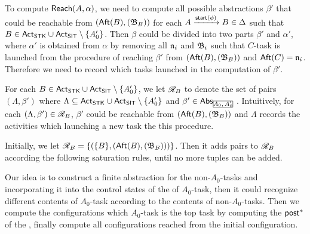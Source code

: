 To compute ${\sf Reach}(A,\alpha)$, we need to compute all possible abstractions $\beta'$ that could be reachable from $({\sf Aft}(B),({\mathfrak{B} }_{B}))$ for each $A\xrightarrow{{\mathsf{start} }(\phi)}B\in\Delta$ such that $B\in{\sf Act}_{\mathsf{STK}}\cup{\sf Act}_{\mathsf{SIT}}\setminus\{A_0'\}$. Then $\beta$ could be divided into two parts $\beta'$ and $\alpha'$, where $\alpha'$ is obtained from $\alpha$ by removing all $\mathfrak{n}_i$ and ${\mathfrak{B} }_i$ such that $C$-task is launched from the procedure of reaching $\beta'$ from $({\sf Aft}(B),({\mathfrak{B} }_{B}))$ and ${\sf Aft}(C) = \mathfrak{n}_i$. Therefore we need to record which tasks launched in the computation of $\beta'$.

For each $B\in{\sf Act}_{\mathsf{STK}}\cup{\sf Act}_{\mathsf{SIT}}\setminus\{A_0'\}$, we let $\mathscr{R}_{B}$ to denote the set of pairs $(\Lambda, \beta')$ where $\Lambda \subseteq {\sf Act}_{\mathsf{STK}}\cup{\sf Act}_{\mathsf{SIT}}\setminus\{A_0'\}$ and $\beta' \in \abs_{\mhcancel{A_0, A_0'}}$. Intuitively, for each $(\Lambda, \beta') \in \mathscr{R}_{B}$, $\beta'$ could be reachable from $({\sf Aft}(B),({\mathfrak{B} }_{B}))$ and $\Lambda$ records the activities which launching a new task the this procedure.

Initially, we let $\mathscr{R}_{B} = \{(\{B\}, ({\sf Aft}(B), ({\mathfrak{B} }_B)))\}$. Then it adds pairs to $\mathscr{R}_{B}$ according the following saturation rules, until no more tuples can be added.





Our idea is to construct a finite abstraction for the non-$A_0$-tasks and incorporating it into the control states of the {\WOTrPDS} of $A_0$-task, then it could recognize different contents of $A_0$-task according to the contents of non-$A_0$-tasks.
Then we compute the configurations which $A_0$-task is the top task by computing the ${\mathsf{post} }^*$ of the {\WOTrPDS}, finally compute all configurations reached from the initial configuration.



